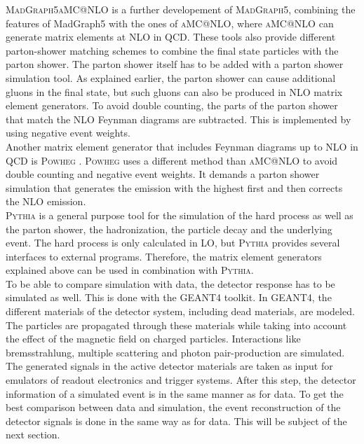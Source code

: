 \textsc{MadGraph5}\textunderscore \textsc{aMC@NLO} \cite{MadGraph5_NLO}  is a further developement of \textsc{MadGraph5}, combining the features of MadGraph5 with the ones of \textsc{aMC@NLO}, where \textsc{aMC@NLO} can generate matrix elements at NLO in QCD. These tools also provide different parton-shower matching schemes to combine the final state particles with the parton shower. The parton shower itself has to be added with a parton shower simulation tool. As explained earlier, the parton shower can cause additional gluons in the final state, but such gluons can also be produced in NLO matrix element generators. To avoid double counting, the parts of the parton shower that match the NLO Feynman diagrams are subtracted. This is implemented by using negative event weights.\\

Another matrix element generator that includes Feynman diagrams up to NLO in QCD is \textsc{Powheg} \cite{Powheg1, Powheg2, Powheg3}. \textsc{Powheg} uses a different method than \textsc{aMC@NLO} to avoid double counting and negative event weights. It demands a parton shower simulation that generates the emission with the highest \pt first and then corrects the NLO emission. \\

\textsc{Pythia} \cite{Pythia82} is a general purpose tool for the simulation of the hard process as well as the parton shower, the hadronization, the particle decay and the underlying event. The hard process is only calculated in LO, but \textsc{Pythia} provides several interfaces to external programs. Therefore, the matrix element generators explained above can be used in combination with \textsc{Pythia}. \\

To be able to compare simulation with data, the detector response has to be simulated as well. This is done with the \textsc{GEANT4}\cite{Geant4} toolkit. In \textsc{GEANT4}, the different materials of the detector system, including dead materials, are modeled. The particles are propagated through these materials while taking into account the effect of the magnetic field on charged particles. Interactions like bremsstrahlung, multiple scattering and photon pair-production are simulated. The generated signals in the active detector materials are taken as input for emulators of readout electronics and trigger systems. After this step, the detector information of a simulated event is in the same manner as for data. To get the best comparison between data and simulation, the event reconstruction of the detector signals is done in the same way as for data. This will be subject of the next section.


